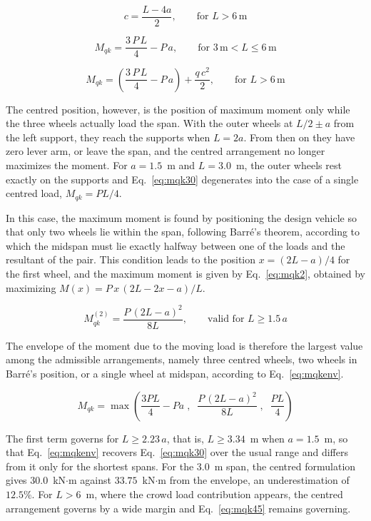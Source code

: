\begin{equation}
c = \frac{L - 4a}{2}, \qquad \text{for } L > 6\,\text{m}
\label{eq:cmomento}
\end{equation}

\begin{equation}
M_{qk} = \frac{3\,P\,L}{4} - P\,a, \qquad \text{for } 3\,\text{m} < L \leq 6\,\text{m}
\label{eq:mqk30}
\end{equation}

\begin{equation}
M_{qk} = \left(\frac{3\,P\,L}{4} - P\,a\right) + \frac{q\,c^2}{2}, \qquad \text{for } L > 6\,\text{m}
\label{eq:mqk45}
\end{equation}

The centred position, however, is the position of maximum moment only while the three wheels actually load the span. With the outer wheels at $L/2 \pm a$ from the left support, they reach the supports when $L = 2a$. From then on they have zero lever arm, or leave the span, and the centred arrangement no longer maximizes the moment. For $a = 1.5$~m and $L = 3.0$~m, the outer wheels rest exactly on the supports and Eq.~\eqref{eq:mqk30} degenerates into the case of a single centred load, $M_{qk} = PL/4$.

In this case, the maximum moment is found by positioning the design vehicle so that only two wheels lie within the span, following Barré's theorem, according to which the midspan must lie exactly halfway between one of the loads and the resultant of the pair. This condition leads to the position $x = (2L-a)/4$ for the first wheel, and the maximum moment is given by Eq.~\eqref{eq:mqk2}, obtained by maximizing $M(x) = P\,x\,(2L - 2x - a)/L$.

\begin{equation}
M_{qk}^{(2)} = \frac{P\,(2L-a)^2}{8L}, \qquad \text{valid for } L \geq 1.5\,a
\label{eq:mqk2}
\end{equation}

The envelope of the moment due to the moving load is therefore the largest value among the admissible arrangements, namely three centred wheels, two wheels in Barré's position, or a single wheel at midspan, according to Eq.~\eqref{eq:mqkenv}.

\begin{equation}
M_{qk} = \max\left(\frac{3PL}{4} - Pa\;,\;\; \frac{P\,(2L-a)^2}{8L}\;,\;\; \frac{PL}{4}\right)
\label{eq:mqkenv}
\end{equation}

The first term governs for $L \geq 2.23\,a$, that is, $L \geq 3.34$~m when $a = 1.5$~m, so that Eq.~\eqref{eq:mqkenv} recovers Eq.~\eqref{eq:mqk30} over the usual range and differs from it only for the shortest spans. For the 3.0~m span, the centred formulation gives $30.0$~kN$\cdot$m against $33.75$~kN$\cdot$m from the envelope, an underestimation of $12.5\%$. For $L > 6$~m, where the crowd load contribution appears, the centred arrangement governs by a wide margin and Eq.~\eqref{eq:mqk45} remains governing.

